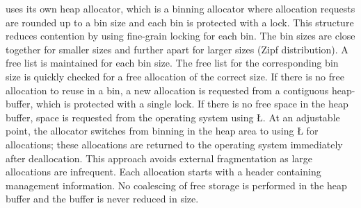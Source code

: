 \documentclass[openright,twoside]{report}
\begin{document}
\uC uses its own heap allocator, which is a binning allocator where allocation requests are rounded up to a bin size and each bin is protected with a lock.
This structure reduces contention by using fine-grain locking for each bin.
The bin sizes are close together for smaller sizes and further apart for larger sizes (Zipf distribution).
A free list is maintained for each bin size.
The free list for the corresponding bin size is quickly checked for a free allocation of the correct size.
If there is no free allocation to reuse in a bin, a new allocation is requested from a contiguous heap-buffer, which is protected with a single lock.
If there is no free space in the heap buffer, space is requested from the operating system using \LGinlinetrue\LGbegin\lgrinde\L{}\endlgrinde\LGend{}.
At an adjustable point, the allocator switches from binning in the heap area to using \LGinlinetrue\LGbegin\lgrinde\L{}\endlgrinde\LGend{} for allocations;
these allocations are returned to the operating system immediately after deallocation.
This approach avoids external fragmentation as large allocations are infrequent.
Each allocation starts with a header containing management information.
No coalescing of free storage is performed in the heap buffer and the buffer is never reduced in size.
\end{document}

